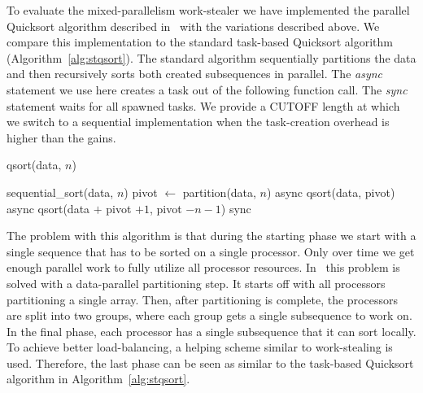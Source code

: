 \documentclass[preprint]{sigplanconf}
\begin{document}
To evaluate the mixed-parallelism work-stealer we have implemented the
parallel Quicksort algorithm described in~\cite{TsigasZhang03} with
the variations described above. We compare this implementation to the standard
task-based Quicksort algorithm (Algorithm~\ref{alg:stqsort}). The
standard algorithm sequentially partitions the data and then
recursively sorts both created subsequences in parallel. The
\emph{async} statement we use here creates a task out of the following
function call. The \emph{sync} statement waits for all spawned
tasks. We provide a CUTOFF length at which we switch to a sequential
implementation when the task-creation overhead is higher than the
gains.

\begin{algorithm}
\caption{qsort(data, $n$)}\label{alg:stqsort}
\begin{algorithmic}[1]
	\RETURN sequential\_sort(data, $n$)
\ELSE
	\STATE pivot $\gets$ partition(data, $n$)
	\STATE async qsort(data, pivot)
	\STATE async qsort(data $+$ pivot $+ 1$, pivot $- n - 1$)
	\STATE sync
\ENDIF
\end{algorithmic}
\end{algorithm}

The problem with this algorithm is that during the starting phase we
start with a single sequence that has to be sorted on a single
processor. Only over time we get enough parallel work to fully utilize
all processor resources. In~\cite{TsigasZhang03} this problem is
solved with a data-parallel partitioning step. It starts off with all
processors partitioning a single array. Then, after partitioning is
complete, the processors are split into two groups, where each group
gets a single subsequence to work on. In the final phase, each
processor has a single subsequence that it can sort locally. To
achieve better load-balancing, a helping scheme similar to
work-stealing is used. Therefore, the last phase can be seen as
similar to the task-based Quicksort algorithm in
Algorithm~\ref{alg:stqsort}.
\end{document}
